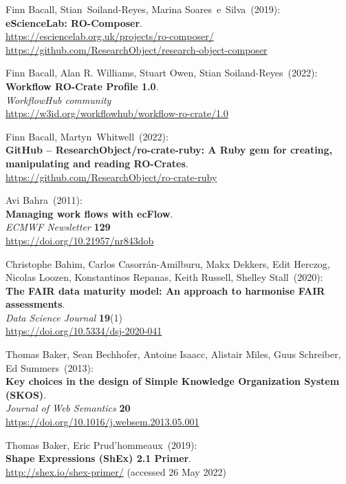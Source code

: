\begin{thebibliography}{9}
Finn Bacall, Stian~Soiland-Reyes, Marina Soares~e~Silva~(2019): \\
\textbf{eScienceLab: RO-Composer}.\\
\url{https://esciencelab.org.uk/projects/ro-composer/}\\
\url{https://github.com/ResearchObject/research-object-composer}

Finn Bacall, Alan R. Williams, Stuart Owen, Stian Soiland-Reyes~(2022): \\
\textbf{Workflow RO-Crate Profile 1.0}.\\
\emph{WorkflowHub community}\\
\url{https://w3id.org/workflowhub/workflow-ro-crate/1.0}

Finn Bacall, Martyn~Whitwell~(2022): \\
\textbf{GitHub -- ResearchObject/ro-crate-ruby: A Ruby gem for creating, manipulating and reading RO-Crates}.\\
\url{https://github.com/ResearchObject/ro-crate-ruby}

Avi Bahra~(2011): \\
\textbf{Managing work flows with ecFlow}.\\
\emph{ECMWF Newsletter} \textbf{129} \\
\url{https://doi.org/10.21957/nr843dob}

Christophe Bahim, Carlos Casorrán-Amilburu, Makx Dekkers, Edit Herczog, Nicolas Loozen, Konstantinos Repanas, Keith Russell, Shelley Stall~(2020): \\
\textbf{The FAIR data maturity model: An approach to harmonise FAIR assessments}.\\
\emph{Data Science Journal} \textbf{19}(1)\\
\url{https://doi.org/10.5334/dsj-2020-041}

Thomas Baker, Sean Bechhofer, Antoine Isaacc, Alistair Miles, Guus Schreiber, Ed Summers~(2013): \\
\textbf{Key choices in the design of Simple Knowledge Organization System (SKOS)}.\\
\emph{Journal of Web Semantics} \textbf{20} \\
\url{https://doi.org/10.1016/j.websem.2013.05.001}

Thomas Baker, Eric Prud'hommeaux~(2019): \\
\textbf{Shape {Expressions} ({ShEx}) 2.1 {Primer}}. \\
\url{http://shex.io/shex-primer/} (accessed 26 May 2022)


\end{thebibliography}
